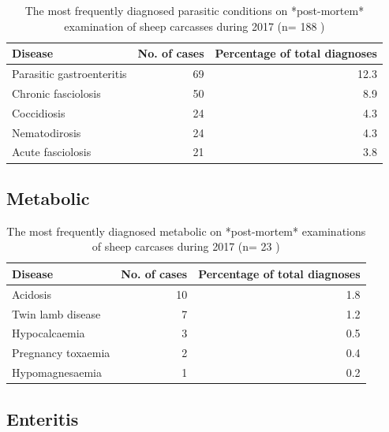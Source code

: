 \documentclass[]{book}
\begin{document}
\begin{table}

\caption{\label{tab:unnamed-chunk-92}The most frequently diagnosed parasitic conditions on *post-mortem* examination of sheep carcasses during 2017 (n= 188 )}
\centering
\begin{tabular}[t]{l|r|r}
\hline
Disease & No. of cases & Percentage of total diagnoses\\
\hline
Parasitic gastroenteritis & 69 & 12.3\\
\hline
Chronic fasciolosis & 50 & 8.9\\
\hline
Coccidiosis & 24 & 4.3\\
\hline
Nematodirosis & 24 & 4.3\\
\hline
Acute fasciolosis & 21 & 3.8\\
\hline
\end{tabular}
\end{table}

\subsection{Metabolic}\label{metabolic}

\begin{table}

\caption{\label{tab:unnamed-chunk-96}The most frequently diagnosed metabolic on *post-mortem* examinations of sheep carcases during 2017 (n= 23 )}
\centering
\begin{tabular}[t]{l|r|r}
\hline
Disease & No. of cases & Percentage of total diagnoses\\
\hline
Acidosis & 10 & 1.8\\
\hline
Twin lamb disease & 7 & 1.2\\
\hline
Hypocalcaemia & 3 & 0.5\\
\hline
Pregnancy toxaemia & 2 & 0.4\\
\hline
Hypomagnesaemia & 1 & 0.2\\
\hline
\end{tabular}
\end{table}

\subsection{Enteritis}\label{enteritis}
\end{document}
